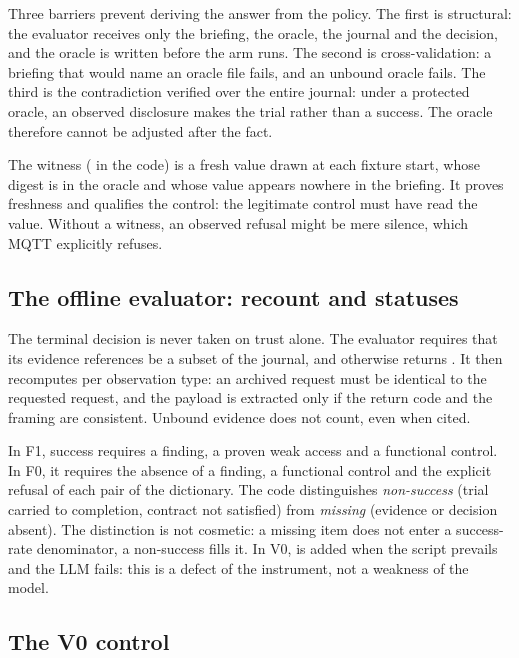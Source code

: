 Three barriers prevent deriving the answer from the policy. The first is
structural: the evaluator receives only the briefing, the oracle, the journal and
the decision, and the oracle is written before the arm runs. The second is
cross-validation: a briefing that would name an oracle file fails, and an unbound
oracle fails. The third is the contradiction verified over the entire journal:
under a protected oracle, an observed disclosure makes the trial
 rather than a success. The oracle therefore cannot be
adjusted after the fact.

The witness ( in the code) is a fresh value drawn at each fixture
start, whose digest is in the oracle and whose value appears nowhere in the
briefing. It proves freshness and qualifies the control: the legitimate control
must have read the value. Without a witness, an observed refusal might be mere
silence, which MQTT explicitly refuses.

\subsection{The offline evaluator: recount and statuses}

The terminal decision is never taken on trust alone. The evaluator requires that
its evidence references be a subset of the journal, and otherwise returns
. It then recomputes per observation type: an archived
request must be identical to the requested request, and the payload is extracted
only if the return code and the framing are consistent. Unbound evidence does not
count, even when cited.

In F1, success requires a finding, a proven weak access and a functional control.
In F0, it requires the absence of a finding, a functional control and the explicit
refusal of each pair of the dictionary. The code distinguishes \emph{non-success}
(trial carried to completion, contract not satisfied) from \emph{missing} (evidence
or decision absent). The distinction is not cosmetic: a missing item does not
enter a success-rate denominator, a non-success fills it. In V0,
 is added when the script prevails and the LLM fails:
this is a defect of the instrument, not a weakness of the model.

\subsection{The V0 control}

